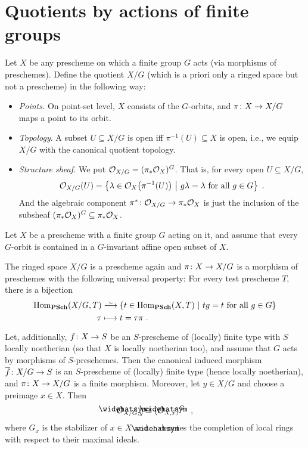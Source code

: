 \documentclass[a4paper,parskip=half,numbers=enddot, DIV=12]{scrreprt}
\begin{document}
\section{Quotients by actions of finite groups}
Let $X$ be any prescheme on which a finite group $G$ acts (via morphisms of preschemes). Define the quotient $X/G$ (which is a priori only a ringed space but not a prescheme) in the following way: 
\begin{itemize}
	\item \emph{Points.} On point-set level, $X$ consists of the $G$-orbits, and $\pi\colon X\morphism X/G$ maps a point to its orbit.
	\item \emph{Topology}. A subset $U\subseteq X/G$ is open iff $\pi^{-1}(U)\subseteq X$ is open, i.e., we equip $X/G$ with the canonical quotient topology.
	\item \emph{Structure sheaf.} We put $\mathcal{O}_{X/G}=(\pi_*\mathcal{O}_X)^G$. That is, for every open $U\subseteq X/G$,
	\begin{align*}
		\mathcal{O}_{X/G}(U)=\left\{\lambda\in\mathcal{O}_X\big(\pi^{-1}(U)\big)\ \middle|\  g\lambda=\lambda\text{ for all }g\in G\right\}\;.
	\end{align*}
	And the algebraic component $\pi^*\colon \Oo_{X/G}\morphism \pi_*\Oo_X$ is just the inclusion of the subsheaf $(\pi_*\mathcal{O}_X)^G\subseteq\pi_*\mathcal{O}_X$.
\end{itemize}
\begin{thm}
	Let $X$ be a prescheme with a finite group $G$ acting on it, and assume that every $G$-orbit is contained in a $G$-invariant affine open subset of $X$.
	\begin{alphanumerate}
		\item The ringed space $X/G$ is a prescheme again and $\pi\colon X\morphism X/G$ is a morphism of preschemes with the following universal property: For every test prescheme $T$, there is a bijection
		\begin{align*}
			\Hom_{\cat{PSch}}(X/G,T)&\isomorphism \left\{t\in\Hom_{\cat{PSch}}(X,T)\st tg=t\text{ for all }g\in G\right\}\\
			\tau&\longmapsto t=\tau\pi\;.
		\end{align*}
		\item Let, additionally, $f\colon X\morphism S$ be an $S$-prescheme of (locally) finite type with $S$ locally noetherian (so that $X$ is locally noetherian too), and assume that $G$ acts by morphisms of $S$-preschemes. Then the canonical induced morphism $\ov{f}\colon X/G\morphism S$ is an $S$-prescheme of (locally) finite type (hence locally noetherian), and $\pi\colon X\morphism X/G$ is a finite morphism. Moreover, let $y\in X/G$ and choose a preimage $x\in X$. Then
		\begin{align*}
			\roof{\Oo}_{X/G,y}\cong (\roof{\Oo}_{X,x})^{G_x}\;,
		\end{align*}
		where $G_x$ is the stabilizer of $x\in X$ and $\roof{\phantom{x}}$ denotes the completion of local rings with respect to their maximal ideals.
	\end{alphanumerate}
\end{thm}
\end{document}
